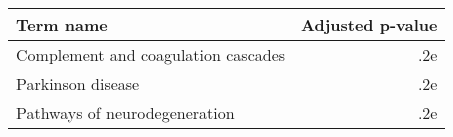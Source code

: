 \begin{tabular}{lr}
\toprule
                          Term name &  Adjusted p-value \\
\midrule
Complement and coagulation cascades &               .2e \\
                  Parkinson disease &               .2e \\
      Pathways of neurodegeneration &               .2e \\
\bottomrule
\end{tabular}
